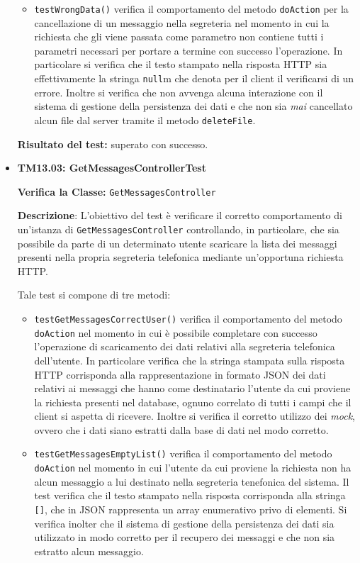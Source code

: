 \begin{itemize}
\begin{itemize}
\item \texttt{testWrongData()} verifica il comportamento del metodo \texttt{doAction} per la cancellazione di un messaggio nella segreteria nel momento in cui la richiesta che gli viene passata come parametro non contiene tutti i parametri necessari per portare a termine con successo l'operazione. In particolare si verifica che il testo stampato nella risposta HTTP sia effettivamente la stringa \texttt{null}m che denota per il client il verificarsi di un errore. Inoltre si verifica che non avvenga alcuna interazione con il sistema di gestione della persistenza dei dati e che non sia \textit{mai} cancellato alcun file dal server tramite il metodo \texttt{deleteFile}.

\end{itemize}
\textbf{Risultato del test:} superato con successo.

\item \textbf{TM13.03: GetMessagesControllerTest}

\textbf{Verifica la Classe:} \texttt{GetMessagesController}

\textbf{Descrizione}: L'obiettivo del test è verificare il corretto comportamento di un'istanza di \texttt{GetMessagesController} controllando, in particolare, che sia possibile da parte di un determinato utente scaricare la lista dei messaggi presenti nella propria segreteria telefonica mediante un'opportuna richiesta HTTP\@.

Tale test si compone di tre metodi:
\begin{itemize}
\item \texttt{testGetMessagesCorrectUser()} verifica il comportamento del metodo \texttt{doAction} nel momento in cui è possibile completare con successo l'operazione di scaricamento dei dati relativi alla segreteria telefonica dell'utente. In particolare verifica che la stringa stampata sulla risposta HTTP corrisponda alla rappresentazione in formato JSON dei dati relativi ai messaggi che hanno come destinatario l'utente da cui proviene la richiesta presenti nel database, ognuno correlato di tutti i campi che il client si aspetta di ricevere. Inoltre si verifica il corretto utilizzo dei \textit{mock}, ovvero che i dati siano estratti dalla base di dati nel modo corretto.

\item \texttt{testGetMessagesEmptyList()} verifica il comportamento del metodo \texttt{doAction} nel momento in cui l'utente da cui proviene la richiesta non ha alcun messaggio a lui destinato nella segreteria tenefonica del sistema. Il test verifica che il testo stampato nella risposta corrisponda alla stringa \texttt{[]}, che in JSON rappresenta un array enumerativo privo di elementi. Si verifica inolter che il sistema di gestione della persistenza dei dati sia utilizzato in modo corretto per il recupero dei messaggi e che non sia estratto alcun messaggio.


\end{itemize}
\end{itemize}
